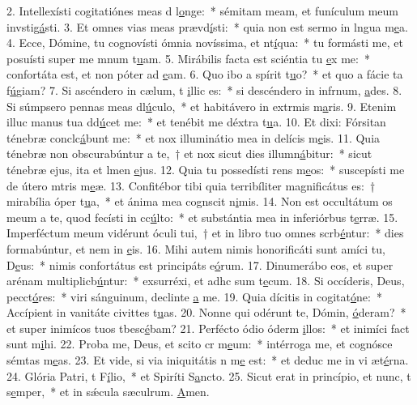 2. Intellexísti cogitatiónes meas d l\uline{o}nge:~* sémitam meam, et funículum meum invstig\uline{á}sti.
3. Et omnes vias meas prævd\uline{í}sti:~* quia non est sermo in lngua m\uline{e}a.
4. Ecce, Dómine, tu cognovísti ómnia novíssima, et nt\uline{í}qua:~* tu formásti me, et posuísti super me mnum t\uline{u}am.
5. Mirábilis facta est sciéntia tu \uline{e}x me:~* confortáta est, et non póter ad \uline{e}am.
6. Quo ibo a spírit t\uline{u}o?~* et quo a fácie ta f\uline{ú}giam?
7. Si ascéndero in cælum, t \uline{i}llic es:~* si descéndero in infrnum, \uline{a}des.
8. Si súmpsero pennas meas dl\uline{ú}culo,~* et habitávero in extrmis m\uline{a}ris.
9. Etenim illuc manus tua dd\uline{ú}cet me:~* et tenébit me déxtra t\uline{u}a.
10. Et dixi: Fórsitan ténebræ conclc\uline{á}bunt me:~* et nox illuminátio mea in delícis m\uline{e}is.
11. Quia ténebræ non obscurabúntur a te,~† et nox sicut dies illumn\uline{á}bitur:~* sicut ténebræ ejus, ita et lmen \uline{e}jus.
12. Quia tu possedísti rens m\uline{e}os:~* suscepísti me de útero mtris m\uline{e}æ.
13. Confitébor tibi quia terribíliter magnificátus es:~† mirabília óper t\uline{u}a,~* et ánima mea cognscit n\uline{i}mis.
14. Non est occultátum os meum a te, quod fecísti in cc\uline{ú}lto:~* et substántia mea in inferiórbus t\uline{e}rræ.
15. Imperféctum meum vidérunt óculi tui,~† et in libro tuo omnes scrb\uline{é}ntur:~* dies formabúntur, et nem in \uline{e}is.
16. Mihi autem nimis honorificáti sunt amíci tu, D\uline{e}us:~* nimis confortátus est principáts e\uline{ó}rum.
17. Dinumerábo eos, et super arénam multiplicb\uline{ú}ntur:~* exsurréxi, et adhc sum t\uline{e}cum.
18. Si occíderis, Deus, pecct\uline{ó}res:~* viri sánguinum, declinte \uline{a} me.
19. Quia dícitis in cogitat\uline{ó}ne:~* Accípient in vanitáte civittes t\uline{u}as.
20. Nonne qui odérunt te, Dómin, \uline{ó}deram?~* et super inimícos tuos tbesc\uline{é}bam?
21. Perfécto ódio óderm \uline{i}llos:~* et inimíci fact sunt m\uline{i}hi.
22. Proba me, Deus, et scito cr m\uline{e}um:~* intérroga me, et cognósce sémtas m\uline{e}as.
23. Et vide, si via iniquitátis n m\uline{e} est:~* et deduc me in vi æt\uline{é}rna.
24. Glória Patri, t F\uline{í}lio,~* et Spiríti S\uline{a}ncto.
25. Sicut erat in princípio, et nunc, t s\uline{e}mper,~* et in sǽcula sæculrum. \uline{A}men.
